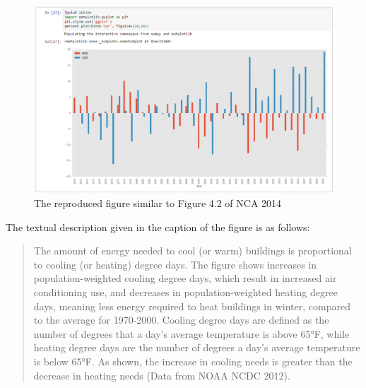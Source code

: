 \begin{figure}
	\includegraphics[width=\textwidth]{nca3image.png}
	\caption{The reproduced figure similar to Figure 4.2 of NCA 2014}
	\label{fig:nca3image}
\end{figure}

The textual description given in the caption of the figure is as follows:
\begin{quotation}
The amount of energy needed to cool (or warm) buildings is proportional to cooling (or heating) degree days. The figure shows increases in population-weighted cooling degree days, which result in increased air conditioning use, and decreases in population-weighted heating degree days, meaning less energy required to heat buildings in winter, compared to the average for 1970-2000. Cooling degree days are defined as the number of degrees that a day's average temperature is above 65°F, while heating degree days are the number of degrees a day’s average temperature is below 65°F. As shown, the increase in cooling needs is greater than the decrease in heating needs (Data from NOAA NCDC 2012).

\end{quotation}

